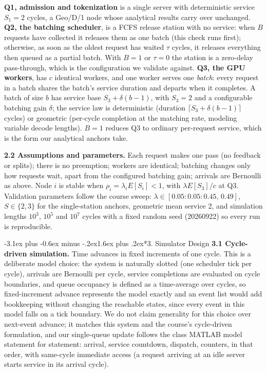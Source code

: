 \documentclass[11pt,a4paper]{article}
\makeatletter
\renewcommand\section{\@startsection{section}{1}{\z@}%
  {-3.1ex plus -0.6ex minus -.2ex}{1.6ex plus .2ex}{\normalfont\Large\bfseries}}
\makeatother
\begin{document}
\textbf{Q1, admission and tokenization} is a single server with deterministic
service $S_1 = 2$ cycles, a Geo/D/1 node whose analytical results carry over
unchanged. \textbf{Q2, the batching scheduler}, is a FCFS release station with
no service: when $B$ requests have collected it releases them as one batch
(this check runs first); otherwise, as soon as the oldest request has waited
$\tau$ cycles, it releases everything then queued as a partial batch. With
$B=1$ or $\tau=0$ the station is a zero-delay pass-through, which is the
configuration we validate against. \textbf{Q3, the GPU workers}, has $c$
identical workers, and one worker serves one \emph{batch}: every request in a
batch shares the batch's service duration and departs when it completes. A
batch of size $b$ has service base $S_3 + \delta(b-1)$, with $S_3 = 2$ and a
configurable batching gain $\delta$; the service law is deterministic
(duration $\lceil S_3 + \delta(b-1)\rceil$ cycles) or geometric (per-cycle
completion at the matching rate, modeling variable decode lengths). $B = 1$
reduces Q3 to ordinary per-request service, which is the form our analytical
anchors take.

\textbf{2.2 Assumptions and parameters.} Each request makes one pass (no
feedback or splits); there is no preemption; workers are identical; batching
changes only how requests wait, apart from the configured batching gain;
arrivals are Bernoulli as above. Node $i$ is stable when
$\rho_i = \lambda_i E[S_i] < 1$, with $\lambda E[S_3]/c$ at Q3. Validation
parameters follow the course sweep: $\lambda \in [0.05{:}0.05{:}0.45,\,0.49]$,
$S \in \{2,3\}$ for the single-station anchors, geometric mean service 2, and
simulation lengths $10^3$, $10^5$ and $10^7$ cycles with a fixed random seed
(20260922) so every run is reproducible.

\section*{3. Simulator Design}
\textbf{3.1 Cycle-driven simulation.} Time advances in fixed increments of one
cycle. This is a deliberate model choice: the system is naturally slotted (one
scheduler tick per cycle), arrivals are Bernoulli per cycle, service
completions are evaluated on cycle boundaries, and queue occupancy is defined
as a time-average over cycles, so fixed-increment advance represents the model
exactly and an event list would add bookkeeping without changing the reachable
states, since every event in this model falls on a tick boundary. We do not
claim generality for this choice over next-event advance; it matches this
system and the course's cycle-driven formulation, and our single-queue update
follows the class MATLAB model statement for statement: arrival, service
countdown, dispatch, counters, in that order, with same-cycle immediate access
(a request arriving at an idle server starts service in its arrival cycle).
\end{document}
